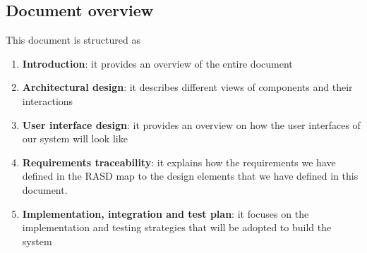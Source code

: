 \subsection{Document overview}
This document is structured as
\begin{enumerate}
	\item \textbf{Introduction}: it provides an overview of the entire document
	\item \textbf{Architectural design}: it describes different views of components and their interactions
	\item \textbf{User interface design}: it provides an overview on how the user interfaces of our system will look like
	\item \textbf{Requirements traceability}: it explains how the requirements we have defined in the RASD map to the design elements that we have defined in this document.
	\item \textbf{Implementation, integration and test plan}: it focuses on the implementation and testing strategies that will be adopted to build the system
\end{enumerate}